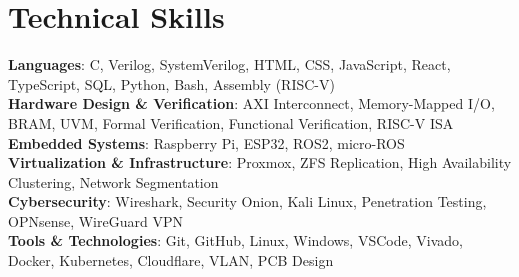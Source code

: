 \section{Technical Skills}
 \begin{itemize}[leftmargin=0.15in, label={}]
    \small{\item{
     \textbf{Languages}{: C, Verilog, SystemVerilog, HTML, CSS, JavaScript, React, TypeScript,  SQL, Python, Bash, Assembly (RISC-V)} \\
     \textbf{Hardware Design \& Verification}{: AXI Interconnect, Memory-Mapped I/O, BRAM, UVM, Formal Verification, Functional Verification, RISC-V ISA} \\
     \textbf{Embedded Systems}{: Raspberry Pi, ESP32, ROS2, micro-ROS} \\
     \textbf{Virtualization \& Infrastructure}{: Proxmox, ZFS Replication, High Availability Clustering, Network Segmentation} \\
     \textbf{Cybersecurity}{: Wireshark, Security Onion, Kali Linux, Penetration Testing, OPNsense, WireGuard VPN} \\
     \textbf{Tools \& Technologies}{: Git, GitHub, Linux, Windows, VSCode, Vivado, Docker, Kubernetes, Cloudflare, VLAN, PCB Design} \\
    }}
 \end{itemize}
